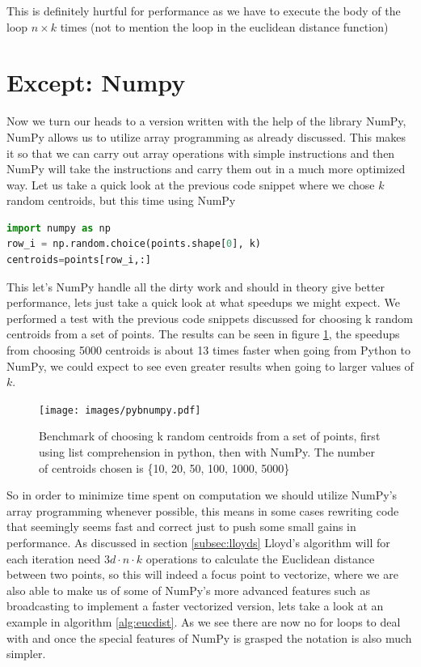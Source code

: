 \documentclass[12pt]{report}
\begin{document}
This is definitely hurtful for performance as we have to execute the body of the loop $n \times k$ times (not to mention the loop in the euclidean distance function)



\newpage
\section{Except: Numpy}
\label{subsec:middle}
Now we turn our heads to a version written with the help of the library NumPy, NumPy allows us to utilize array programming as already discussed. This makes it so that we can carry out array operations with simple instructions and then NumPy will take the instructions and carry them out in a much more optimized way. Let us take a quick look at the previous code snippet where we chose $k$ random centroids, but this time using NumPy

\begin{lstlisting}[language=Python]
import numpy as np
row_i = np.random.choice(points.shape[0], k)
centroids=points[row_i,:]
\end{lstlisting}

This let's NumPy handle all the dirty work and should in theory give better performance, lets just take a quick look at what speedups we might expect. We performed a test with the previous code snippets discussed for choosing k random centroids from a set of points. The results can be seen in figure \ref{fig:numpyvspython}, the speedups from choosing 5000 centroids is about 13 times faster when going from Python to NumPy, we could expect to see even greater results when going to larger values of $k$.

\begin{figure} [H]
  \centering
  \texttt{[image: images/pybnumpy.pdf]}
  \caption{Benchmark of choosing k random centroids from a set of points, first using list comprehension in python, then with NumPy. The number of centroids chosen is \{10, 20, 50, 100, 1000, 5000\}}
  \label{fig:numpyvspython}
\end{figure}

So in order to minimize time spent on computation we should utilize NumPy's array programming whenever possible, this means in some cases rewriting code that seemingly seems fast and correct just to push some small gains in performance.
As discussed in section \ref{subsec:lloyds} Lloyd's algorithm will for each iteration need $3d \cdot n \cdot k$ operations to calculate the Euclidean distance between two points, so this will indeed a focus point to vectorize, where we are also able to make us of some of NumPy's more advanced features such as broadcasting to implement a faster vectorized version, lets take a look at an example in algorithm \ref{alg:eucdist}. As we see there are now no for loops to deal with and once the special features of NumPy is grasped the notation is also much simpler.
\end{document}
